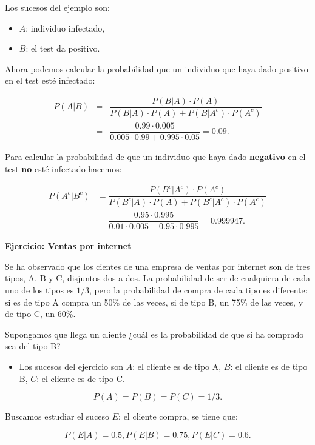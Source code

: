 \documentclass[
  letterpaper,
  DIV=11,
  numbers=noendperiod]{scrreprt}
\providecommand{\tightlist}{%
  \setlength{\itemsep}{0pt}\setlength{\parskip}{0pt}}\usepackage{longtable,booktabs,array}
\begin{document}
Los sucesos del ejemplo son:

\begin{itemize}
\tightlist
\item
  \(A\): individuo infectado,
\item
  \(B\): el test da positivo.
\end{itemize}

Ahora podemos calcular la probabilidad que un individuo que haya dado
positivo en el test esté infectado:

\begin{eqnarray*}
P(A|B) & =& \dfrac{P(B|A)\cdot P(A)}{P(B|A)\cdot P(A)+P(B|A^c)\cdot P(A^c)}\\
&=&\dfrac{0.99\cdot 0.005}{0.005\cdot 0.99+0.995\cdot 0.05}=0.09.
\end{eqnarray*}

Para calcular la probabilidad de que un individuo que haya dado
\textbf{negativo} en el test \textbf{no} esté infectado hacemos:

\[
\begin{array}{rl} P(A^c|B^c)& =\dfrac{P(B^c|A^c)\cdot P(A^c)}{P(B^c|A)\cdot P(A)+P(B^c|A^c)\cdot P(A^c)}\\ & =\dfrac{0.95\cdot 0.995}{0.01\cdot 0.005+0.95\cdot 0.995}=0.999947.\end{array}
\]

\textbf{Ejercicio: Ventas por internet}

Se ha observado que los cientes de una empresa de ventas por internet
son de tres tipos, A, B y C, disjuntos dos a dos. La probabilidad de ser
de cualquiera de cada uno de los tipos es \(1/3\), pero la probabilidad
de compra de cada tipo es diferente: si es de tipo A compra un 50\% de
las veces, si de tipo B, un 75\% de las veces, y de tipo C, un 60\%.

Supongamos que llega un cliente ¿cuál es la probabilidad de que si ha
comprado sea del tipo B?

\begin{itemize}
\tightlist
\item
  Los sucesos del ejercicio son \(A\): el cliente es de tipo A, \(B\):
  el cliente es de tipo B, \(C\): el cliente es de tipo C.
\end{itemize}

\[P(A)=P(B)=P(C)=1/3.\]

Buscamos estudiar el suceso \(E\): el cliente compra, se tiene que:

\[P(E|A)=0.5, P(E|B)=0.75, P(E|C)=0.6.\]
\end{document}
